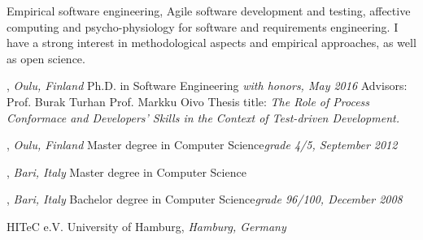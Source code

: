 \documentclass[9pt]{article}
\begin{document}
\textheight=580pt

\noindent Empirical software engineering, Agile software development and testing, affective computing and psycho-physiology for software and requirements engineering. I have a strong interest in methodological aspects and empirical approaches, as well as open science.
\bigskip
\medskip




, \emph{Oulu, Finland} \vspace{0.01in} 
\newline Ph.D. in Software Engineering {\em with honors, May 2016}
\newline Advisors: Prof. Burak Turhan \amper{} Prof. Markku Oivo 
\newline Thesis title: {\em The Role of Process Conformace and Developers' Skills in the Context of Test-driven Development.}

\bigskip


, \emph{Oulu, Finland} \vspace{0.01in}  
\newline\noindent Master degree in Computer Science{\em grade 4/5, September 2012}

\bigskip

, \emph{Bari, Italy} \vspace{0.01in}  
\newline\noindent Master degree in Computer Science 


\bigskip

, \emph{Bari, Italy} \vspace{0.01in}  
\newline\noindent Bachelor degree in Computer Science{\em grade 96/100, December 2008}

\bigskip
\medskip
{}

\noindent HITeC e.V. \amper{} University of Hamburg, \emph{Hamburg, Germany} \vspace{0.01in} 
\newline{}
\bigskip
\end{document}
